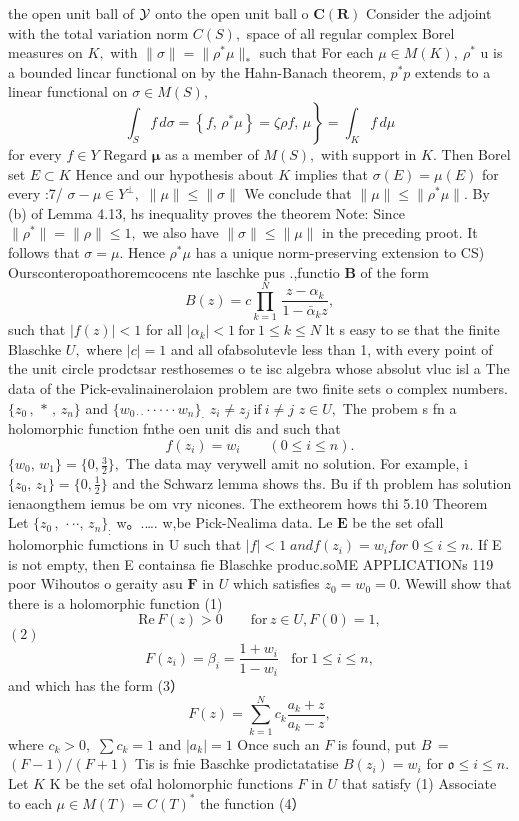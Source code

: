 the open unit ball of ${\cal{Y}}$ onto the open unit ball o ${\boldsymbol{C}}({\boldsymbol{R}})$ Consider the adjoint with the total variation norm $C(S),$ space of all regular complex Borel measures on $K,$ with $\|\sigma\|=\|\rho^{*}\mu\|_{*}$ such that For each $\mu\in M(K),\ \rho^{*}$ u is a bounded lincar functional on by the Hahn-Banach theorem, $p^{*}p$ extends to a linear functional on $\sigma\in M(S),$ $$ \left.\int_{S}f\,d\sigma=\left\{f,\,\rho^{*}\mu\right\}=\zeta\rho f,\,\mu\right\}=\int_{K}f\,d\mu $$ for every $\scriptstyle f\in Y$ Regard $\boldsymbol{\mu}$ as a member of $M(S),$ with support in $K.$ Then Borel set $\scriptstyle{E\subset K}$ Hence and our hypothesis about $K$ implies that $\sigma(E)=\mu(E)$ for every :7/ $\sigma-\mu\in Y^{\perp},$ $\|\mu\|\leq\|\sigma\|$ We conclude that $\|\mu\|\leq\|\rho^{*}\mu\|.$ By (b) of Lemma 4.13, hs inequality proves the theorem Note: Since $\|\rho^{*}\|=\|\rho\|\leq1,$ we also have $\|\sigma\|\leq\|\mu\|$ in the preceding proot. It follows that $\sigma=\mu.$ Hence $\rho^{*}\mu$ has a unique norm-preserving extension to CS) Oursconteropoathoremcocens nte laschke pus .,functio $\boldsymbol{B}$ of the form $$ B(z)=c\prod_{k=1}^{N}\,{\frac{z-\alpha_{k}}{1-\bar{\alpha}_{k}z}}, $$ such that $|f(z)|<1$ for all $|\alpha_{k}|<1{\mathrm{~for~}}1\leq k\leq N$ lt s easy to se that the finite Blaschke $U,$ where $|c|=1$ and all ofabsolutevle less than 1, with every point of the unit circle prodctsar resthosemes o te isc algebra whose absolut vluc isl a The data of the Pick-evalinainerolaion problem are two finite sets o complex numbers. $\{z_{0}\,,\,\ast\,,\,z_{n}\}$ and $\{w_{0\cdot{\cdot}}\cdot\cdot{\cdot}\cdot{\cdot}w_{n}\}_{\cdot}$ $z_{i}\neq z_{j}{\mathrm{~if~}}i\neq j$ $z\in U,$ The probem s fn a holomorphic function fnthe oen unit dis and such that $$ f(z_{i})=w_{i}\qquad(0\leq i\leq n). $$ $\{w_{0},\,w_{1}\}=\{0,\textstyle{\frac{3}{2}}\},$ The data may verywell amit no solution. For example, i $\{z_{0},\,z_{1}\}=\{0,\frac{1}{2}\}$ and the Schwarz lemma shows ths. Bu if th problem has solution ienaongthem iemus be om vry nicones. The extheorem hows thi 5.10 Theorem Let $\{z_{0}\,,\,\cdot\cdot\cdot,\,z_{n}\}_{:}$ {w。.…. w,}be Pick-Nealima data. Le $\boldsymbol{E}$ be the set ofall holomorphic fumctions in U such that $|f|<1\;a n d f(z_{i})=w_{i}f o r\;0\leq i\leq n.$ If E is not empty, then E containsa fie Blaschke produc.soME APPLICATIONs 119 poor Wihoutos o geraity asu ${\boldsymbol{F}}$ in $U$ which satisfies $z_{0}=w_{0}=0.$ Wewill show that there is a holomorphic function (1) $$ {\mathrm{Re}}\,F(z)>0\qquad{\mathrm{for}}\,z\in U,F(0)=1, $$ $\left(2\right)$ $$ F(z_{i})=\beta_{i}=\frac{1+w_{i}}{1-w_{i}}\mathrm{~~~~for~}1\le i\le n, $$ and which has the form (3） $$ F(z)=\sum_{k=1}^{N}c_{k}{\frac{a_{k}+z}{a_{k}-z}}, $$ where $c_{k}>0,$ $\textstyle\sum c_{k}=1$ and $|a_{k}|=1$ Once such an ${\mathbf{}}F$ is found, put $\scriptstyle B\,=$ $(F-1)/(F+1)$ Tis is fnie Baschke prodictatatise $B(z_{i})=w_{i}$ for ${\mathfrak{o}}\leq i\leq n.$ Let $\textstyle K$ K be the set ofal holomorphic functions ${\mathbf{}}F$ in $U$ that satisfy (1) Associate to each $\mu\in M(T)=C(T)^{*}$ the function (4） $$ 